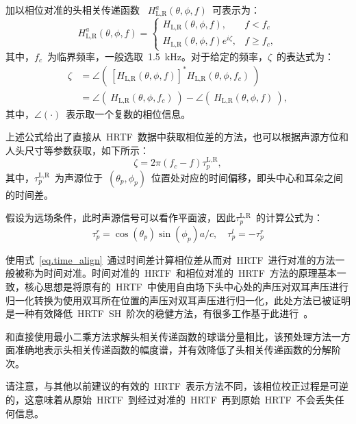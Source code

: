 加以相位对准的头相关传递函数~
$H_{\text{L,R}}^{a}(\theta,\phi,f)$~可表示为：
\begin{equation}\label{eq.HRTF_pre}
H_{\text{L,R}}^{a}(\theta,\phi,f) =
\begin{cases}
 H_{\text{L,R}}(\theta,\phi,f)  ,  & f<f_{c} \\
 H_{\text{L,R}}(\theta,\phi,f) e^{i\zeta} , & f \geq f_{c},
\end{cases}
\end{equation}
其中，$f_{c}$~为临界频率，一般选取~1.5~kHz。对于给定的频率，$\zeta$~的表达式为：
\begin{align}
\zeta & = \angle \left(~ [ H_{\text{L,R}}(\theta,\phi,f)]^{*} H_{\text{L,R}}(\theta,\phi,f_{c})~\right) \nonumber \\
& = \angle \left(~ H_{\text{L,R}}(\theta,\phi,f_{c}) ~\right) - \angle \left(~ H_{\text{L,R}}(\theta,\phi,f) ~\right),
\end{align}
其中，$\angle(\cdot)$~表示取一个复数的相位信息。

上述公式给出了直接从~HRTF~数据中获取相位差的方法，也可以根据声源方位和人头尺寸等参数获取，如下所示：
\begin{equation}\label{eq.time_align}
\zeta = 2\pi (f_{c} - f) \tau_{p}^{\text{L,R}},
\end{equation}
其中，$\tau_{p}^{\text{L,R}}$~为声源位于~$(\theta_{p},\phi_{p})$~位置处对应的时间偏移，即头中心和耳朵之间的时间差。

假设为远场条件，此时声源信号可以看作平面波，因此$\tau_{p}^{\text{L,R}}$~的计算公式为：
\begin{equation}
\tau_{p}^{r}=\cos \left(\theta_{p}\right) \sin \left(\phi_{p}\right) a/c, \quad \tau_{p}^{l}=-\tau_{p}^{r}
\end{equation}

使用式~\eqref{eq.time_align}~通过时间差计算相位差从而对~HRTF~进行对准的方法一般被称为时间对准。时间对准的~HRTF~和相位对准的~HRTF~方法的原理基本一致，核心思想是将原有的~HRTF~中使用自由场下头中心处的声压对双耳声压进行归一化转换为使用双耳所在位置的声压对双耳声压进行归一化，此处方法已被证明是一种有效降低~HRTF~SH~阶次的稳健方法，有很多工作基于此进行~。

和直接使用最小二乘方法求解头相关传递函数的球谐分量相比，该预处理方法一方面准确地表示头相关传递函数的幅度谱，并有效降低了头相关传递函数的分解阶次。

请注意，与其他以前建议的有效的~HRTF~表示方法不同，该相位校正过程是可逆的，这意味着从原始~HRTF~到经过对准的~HRTF~再到原始~HRTF~不会丢失任何信息。

